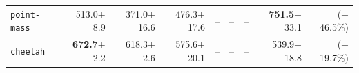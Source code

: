 \documentclass{article}\usepackage[margin=1in]{geometry}\usepackage{booktabs,graphicx,xcolor,amsmath}
\newcommand{\pmse}[1]{{\scriptsize$\pm$#1}}\newcommand{\name}{Density-FB}\newcommand{\cref}[1]{}
\begin{document}
\begin{table}[htb]
{\begin{tabular}{lrrrrrrrr}
    \texttt{point-mass}                    & 513.0\pmse{8.9} & 371.0\pmse{16.6} & 476.3\pmse{17.6} & -- & -- & -- & \textbf{751.5}\pmse{33.1} & \textcolor[RGB]{0,150,40}{($+$46.5\%)} \\
    \texttt{cheetah}                       & \textbf{672.7}\pmse{2.2} & 618.3\pmse{2.6} & 575.6\pmse{20.1} & -- & -- & -- & 539.9\pmse{18.8} & \textcolor[RGB]{187,37,37}{($-$19.7\%)} \\
    \bottomrule
    \end{tabular}%
    }
\end{table}
\end{document}
